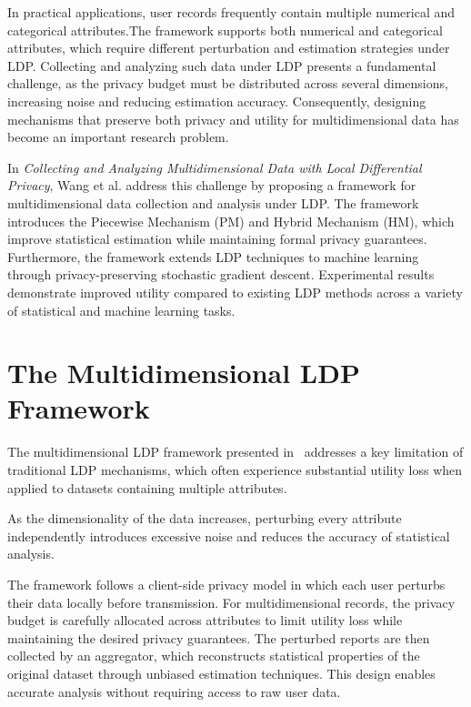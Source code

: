 \documentclass[sigconf]{acmart}
\begin{document}
In practical applications, user records frequently contain multiple numerical and categorical attributes.The framework supports both numerical and categorical attributes, which require different perturbation and estimation strategies under LDP.
 Collecting and analyzing such data under LDP presents a fundamental challenge, as the privacy budget must be distributed across several dimensions, increasing noise and reducing estimation accuracy. Consequently, designing mechanisms that preserve both privacy and utility for multidimensional data has become an important research problem.

In \textit{Collecting and Analyzing Multidimensional Data with Local Differential Privacy}, Wang et al. address this challenge by proposing a framework for multidimensional data collection and analysis under LDP. The framework introduces the Piecewise Mechanism (PM) and Hybrid Mechanism (HM), which improve statistical estimation while maintaining formal privacy guarantees. Furthermore, the framework extends LDP techniques to machine learning through privacy-preserving stochastic gradient descent. Experimental results demonstrate improved utility compared to existing LDP methods across a variety of statistical and machine learning tasks.



\section{The Multidimensional LDP Framework}
The multidimensional LDP framework presented in~\cite{wang2019} addresses a key limitation of traditional LDP mechanisms, which often experience substantial utility loss when applied to datasets containing multiple attributes.

 As the dimensionality of the data increases, perturbing every attribute independently introduces excessive noise and reduces the accuracy of statistical analysis.

The framework follows a client-side privacy model in which each user perturbs their data locally before transmission. For multidimensional records, the privacy budget is carefully allocated across attributes to limit utility loss while maintaining the desired privacy guarantees. The perturbed reports are then collected by an aggregator, which reconstructs statistical properties of the original dataset through unbiased estimation techniques. This design enables accurate analysis without requiring access to raw user data.
\end{document}
